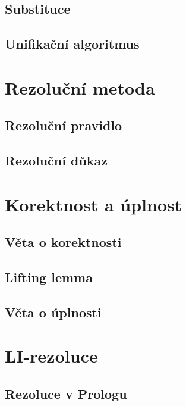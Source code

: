 \subsection{Substituce}

\subsection{Unifikační algoritmus}


\section{Rezoluční metoda}

\subsection{Rezoluční pravidlo}

\subsection{Rezoluční důkaz}


\section{Korektnost a úplnost}

\subsection{Věta o korektnosti}

\subsection{Lifting lemma}

\subsection{Věta o úplnosti}


\section{LI-rezoluce}

\subsection{Rezoluce v Prologu}




